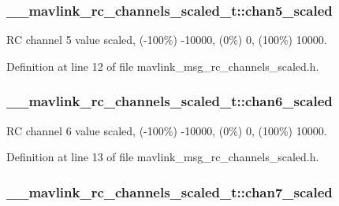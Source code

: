 \hypertarget{struct____mavlink__rc__channels__scaled__t_a746191bf8db147d0271f755814e62c5d}{
\subsubsection[{chan5\-\_\-scaled}]{ \-\_\-\-\_\-mavlink\-\_\-rc\-\_\-channels\-\_\-scaled\-\_\-t\-::chan5\-\_\-scaled}}\label{struct____mavlink__rc__channels__scaled__t_a746191bf8db147d0271f755814e62c5d}


R\-C channel 5 value scaled, (-\/100\%) -\/10000, (0\%) 0, (100\%) 10000. 



Definition at line 12 of file mavlink\-\_\-msg\-\_\-rc\-\_\-channels\-\_\-scaled.\-h.

\hypertarget{struct____mavlink__rc__channels__scaled__t_a0554cbaeb193f0243986c02c6396b159}{
\subsubsection[{chan6\-\_\-scaled}]{ \-\_\-\-\_\-mavlink\-\_\-rc\-\_\-channels\-\_\-scaled\-\_\-t\-::chan6\-\_\-scaled}}\label{struct____mavlink__rc__channels__scaled__t_a0554cbaeb193f0243986c02c6396b159}


R\-C channel 6 value scaled, (-\/100\%) -\/10000, (0\%) 0, (100\%) 10000. 



Definition at line 13 of file mavlink\-\_\-msg\-\_\-rc\-\_\-channels\-\_\-scaled.\-h.

\hypertarget{struct____mavlink__rc__channels__scaled__t_a1e3c67b2bff9476d2c2da3e757993a1b}{
\subsubsection[{chan7\-\_\-scaled}]{ \-\_\-\-\_\-mavlink\-\_\-rc\-\_\-channels\-\_\-scaled\-\_\-t\-::chan7\-\_\-scaled}}\label{struct____mavlink__rc__channels__scaled__t_a1e3c67b2bff9476d2c2da3e757993a1b}


